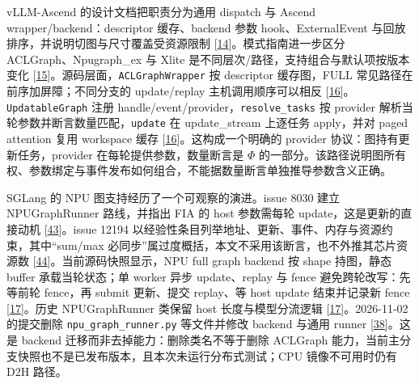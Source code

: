 \documentclass[
  UTF8,
  zihao=5]{ctexart}
\begin{document}
vLLM-Ascend 的设计文档把职责分为通用 dispatch 与 Ascend
wrapper/backend：descriptor 缓存、backend 参数 hook、ExternalEvent
与回放排序，并说明切图与尺寸覆盖受资源限制
{[}\protect\hyperlink{ref-vllmascenddesign}{14}{]}。模式指南进一步区分
ACLGraph、Npugraph\_ex 与 Xlite
是不同层次/路径，支持组合与默认项按版本变化
{[}\protect\hyperlink{ref-vllmascendmode}{15}{]}。源码层面，\texttt{ACLGraphWrapper}
按 descriptor 缓存图，FULL 常见路径在前序加屏障；不同分支的
update/replay 主机调用顺序可以相反
{[}\protect\hyperlink{ref-vllmascend2026impl}{16}{]}。\texttt{UpdatableGraph}
注册 handle/event/provider，\texttt{resolve\_tasks} 按 provider
解析当轮参数并断言数量匹配，\texttt{update} 在 update\_stream 上逐任务
apply，并对 paged attention 复用 workspace 缓存
{[}\protect\hyperlink{ref-vllmascend2026impl}{16}{]}。这构成一个明确的
provider 协议：图持有更新任务，provider 在每轮提供参数，数量断言是
\(\Phi\)
的一部分。该路径说明图所有权、参数绑定与事件发布如何组合，不能据数量断言单独推导参数含义正确。

SGLang 的 NPU 图支持经历了一个可观察的演进。issue 8030 建立
NPUGraphRunner 路线，并指出 FIA 的 host 参数需每轮
update，这是更新的直接动机
{[}\protect\hyperlink{ref-sglang8030}{43}{]}。issue 12194
以经验性条目列举地址、更新、事件、内存与资源约束，其中``sum/max
必同步''属过度概括，本文不采用该断言，也不外推其芯片资源数
{[}\protect\hyperlink{ref-sglang12194}{44}{]}。当前源码快照显示，NPU
full graph backend 按 shape 持图，静态 buffer 承载当轮状态；单 worker
异步 update、replay 与 fence 避免跨轮改写：先等前轮 fence，再 submit
更新、提交 replay、等 host update 结束并记录新 fence
{[}\protect\hyperlink{ref-sglang2026impl}{17}{]}。历史 NPUGraphRunner
类保留 host 长度与模型分流逻辑
{[}\protect\hyperlink{ref-sglang2026impl}{17}{]}。2026-11-02 的提交删除
\texttt{npu\_graph\_runner.py} 等文件并修改 backend 与通用 runner
{[}\protect\hyperlink{ref-sglang2026refactor}{38}{]}。这是 backend
迁移而非去掉能力：删除类名不等于删除 ACLGraph
能力，当前主分支快照也不是已发布版本，且本次未运行分布式测试；CPU
镜像不可用时仍有 D2H 路径。
\end{document}
